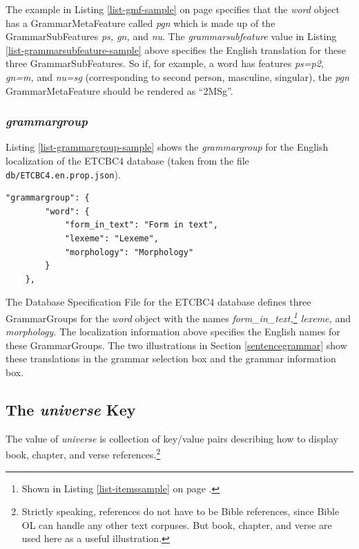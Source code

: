 \documentclass[11pt,oneside,a4paper]{memoir}
\begin{document}
The example in Listing \ref{list-gmf-sample} on page \pageref{list-gmf-sample} specifies that the
\emph{word} object has a GrammarMetaFeature called \emph{pgn} which is made up of the
GrammarSubFeatures \emph{ps, gn,} and \emph{nu}. The \emph{grammarsubfeature} value in Listing
\ref{list-grammarsubfeature-sample} above specifies the English translation for these three
GrammarSubFeatures. So if, for example, a word has features \emph{ps=p2, gn=m,} and \emph{nu=sg}
(corresponding to second person, masculine, singular), the \emph{pgn} GrammarMetaFeature should be
rendered as ``2MSg''.


\subsubsection{\emph{grammargroup}}

Listing \ref{list-grammargroup-sample} shows the \emph{grammargroup} for the English localization of
the ETCBC4 database (taken from the file \texttt{db/ETCBC4.en.prop.json}).

\begin{lstlisting}[caption=A sample grammargroup value,label=list-grammargroup-sample]
    "grammargroup": {
        "word": {
            "form_in_text": "Form in text",
            "lexeme": "Lexeme",
            "morphology": "Morphology"
        }
    },
\end{lstlisting}

The Database Specification File for the ETCBC4 database defines three GrammarGroups for the
\emph{word} object with the names \emph{form\_in\_text,\footnote{Shown in Listing
    \ref{list-itemssample} on page \pageref{list-itemssample}.} lexeme,} and \emph{morphology.} The
localization information above specifies the English names for these GrammarGroups. The two
illustrations in Section \ref{sentencegrammar} show these translations in the grammar selection box
and the grammar information box.

\subsection{The \emph{universe} Key}\label{universe-loc}

The value of \emph{universe} is collection of key/value pairs describing how to display book,
chapter, and verse references.\footnote{Strictly speaking, references do not have to be Bible
  references, since Bible OL can handle any other text corpuses. But book, chapter, and verse are
  used here as a useful illustration.}
\end{document}

